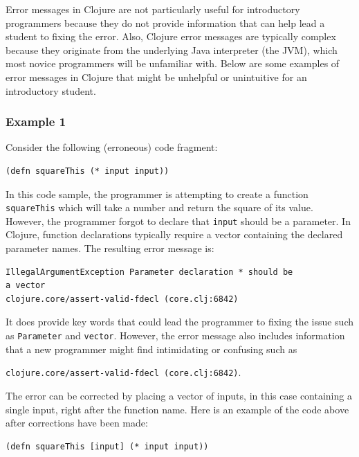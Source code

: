 \documentclass[12pt]{article}
\newcommand{\comment}[1]{{\bf \tt  {#1}}}
\newcommand{\emcomment}[1]{\textcolor{ForestGreen}{\comment{Elena: {#1}}}}
\begin{document}
Error messages in Clojure are not particularly useful for introductory programmers because they do not provide information that can help lead a student to fixing the error.
Also, Clojure error messages are typically complex because they originate from the underlying Java interpreter (the JVM), which most %
novice programmers will be unfamiliar with.
Below are some examples of error messages in Clojure that might be unhelpful or unintuitive for an introductory student.

\subsubsection{Example 1}\label{sec:ex1}

Consider the following (erroneous) code fragment:
\begin{verbatim}
(defn squareThis (* input input))
\end{verbatim}

In this code sample, the programmer is attempting to create a function \texttt{squareThis} which will take a number and return the square of its value.
However, the programmer forgot to declare that \texttt{input} should be a parameter.
In Clojure, function declarations typically require a vector containing the declared parameter names.
The resulting error message is: 
\begin{verbatim}
IllegalArgumentException Parameter declaration * should be 
a vector 
clojure.core/assert-valid-fdecl (core.clj:6842)
\end{verbatim}
It does provide key words that could lead the programmer to fixing the issue such as \texttt{Parameter} and \texttt{vector}.
However, the error message also includes information that a new programmer might find intimidating or confusing such as 

\noindent
\texttt{clojure.core/assert-valid-fdecl (core.clj:6842)}.



The error can be corrected by placing a vector of inputs, in this case containing a single input, right after the function name.
Here is an example of the code above after corrections have been made:
\begin{verbatim}
(defn squareThis [input] (* input input))
\end{verbatim}
\end{document}
